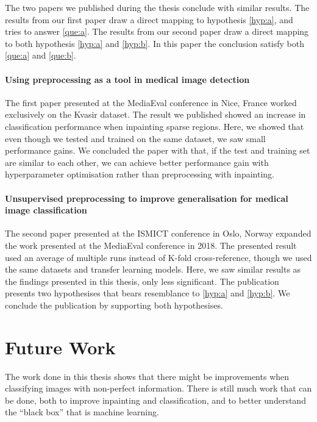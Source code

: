 The two papers we published during the thesis conclude with similar results. The results from our first paper draw a direct mapping to hypothesis \ref{hyp:a}, and tries to answer \ref{que:a}. The results from our second paper draw a direct mapping to both hypothesis \ref{hyp:a} and \ref{hyp:b}. In this paper the conclusion satisfy both \ref{que:a} and \ref{que:b}. 


\paragraph{Using preprocessing as a tool in medical image detection~\cite{Mathias2018MediaevalPaper}}
The first paper presented at the MediaEval conference in Nice, France worked exclusively on the Kvasir dataset. The result we published showed an increase in classification performance when inpainting sparse regions. 
Here, we showed that even though we tested and trained on the same dataset, we saw small performance gains. We concluded the paper with that, if the test and training set are similar to each other, we can achieve better performance gain with hyperparameter optimisation rather than preprocessing with inpainting. 

\paragraph{Unsupervised preprocessing to improve generalisation for medical image classification~\cite{Mathias2019IEEpaper}}
The second paper presented at the ISMICT conference in Oslo, Norway expanded the work presented at the MediaEval conference in 2018.
The presented result used an average of multiple runs instead of K-fold cross-reference, though we used the same datasets and transfer learning models.
Here, we saw similar results as the findings presented in this thesis, only less significant. The publication presents two hypothesises that bears resemblance to \ref{hyp:a} and \ref{hyp:b}. We conclude the publication by supporting both hypothesises.




\section{Future Work}
The work done in this thesis shows that there might be improvements when classifying images with non-perfect information. There is still much work that can be done, both to improve inpainting and classification, and to better understand the ``black box'' that is machine learning. 

